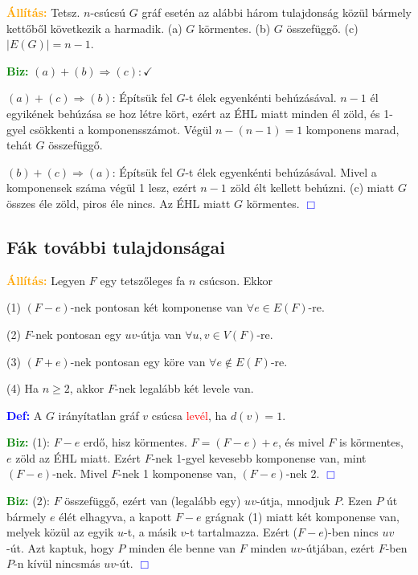 \documentclass[../szamtud.tex]{subfiles}
\begin{document}
        \textcolor{orange}{\textbf{Állítás:}} Tetsz. $n$-csúcsú $G$ gráf esetén az alábbi három tulajdonság közül bármely kettőből következik a harmadik. (a) $G$ körmentes. \qquad (b) $G$ összefüggő. \qquad (c) $|E(G)|=n-1$.

        \textcolor{green}{\textbf{Biz:}} $(a)+(b) \Rightarrow (c): \checkmark$

        $(a)+(c)\Rightarrow (b)$: Építsük fel $G$-t élek egyenkénti behúzásával. $n-1$ él egyikének behúzása se hoz létre kört, ezért az ÉHL miatt minden él zöld, és 1-gyel csökkenti a komponensszámot. Végül $n-(n-1)=1$ komponens marad, tehát $G$ összefüggő.

        $(b)+(c) \Rightarrow (a)$: Építsük fel $G$-t élek egyenkénti behúzásával. Mivel a komponensek száma végül 1 lesz, ezért $n-1$ zöld élt kellett behúzni. (c) miatt $G$ összes éle zöld, piros éle nincs. Az ÉHL miatt $G$ körmentes. \textcolor{blue}{$\Box$}

    \subsection{Fák további tulajdonságai}

        \textcolor{orange}{\textbf{Állítás:}} Legyen $F$ egy tetszőleges fa $n$ csúcson. Ekkor

        (1) $(F-e)$-nek pontosan két komponense van $\forall e\in E(F)$-re.

        (2) $F$-nek pontosan egy $uv$-útja van $\forall u,v\in V(F)$-re.

        (3) $(F+e)$-nek pontosan egy köre van $\forall e\notin E(F)$-re.

        (4) Ha $n \geq 2$, akkor $F$-nek legalább két levele van.

        \textcolor{blue}{\textbf{Def:}} A $G$ irányítatlan gráf $v$ csúcsa \textcolor{red}{levél}, ha $d(v)=1$.

        \textcolor{green}{\textbf{Biz:}} (1): $F-e$ erdő, hisz körmentes. $F=(F-e)+e$, és mivel $F$ is körmentes, $e$ zöld az ÉHL miatt. Ezért $F$-nek 1-gyel kevesebb komponense van, mint $(F-e)$-nek. Mivel $F$-nek 1 komponense van, $(F-e)$-nek 2. \textcolor{blue}{$\Box$}

        \textcolor{green}{\textbf{Biz:}} (2): $F$ összefüggő, ezért van (legalább egy) $uv$-útja, mnodjuk $P$. Ezen $P$ út bármely $e$ élét elhagyva, a kapott $F-e$ grágnak (1) miatt két komponense van, melyek közül az egyik $u$-t, a másik $v$-t tartalmazza. Ezért ($F-e$)-ben nincs $uv$-út. Azt kaptuk, hogy $P$ minden éle benne van $F$ minden $uv$-útjában, ezért $F$-ben $P$-n kívül nincsmás $uv$-út. \textcolor{blue}{$\Box$}
\end{document}
